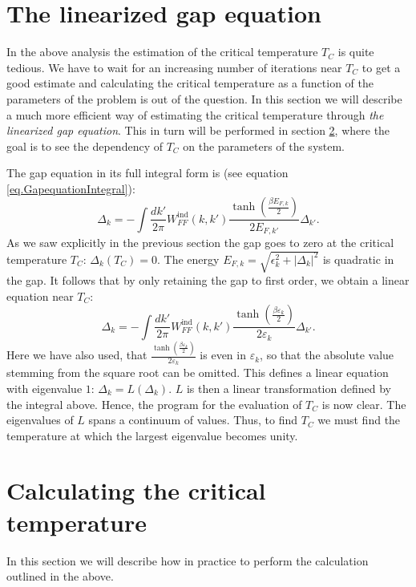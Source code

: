 \section{The linearized gap equation} \label{sec.linearizedgapequation}
In the above analysis the estimation of the critical temperature $T_C$ is quite tedious. We have to wait for an increasing number of iterations near $T_C$ to get a good estimate and calculating the critical temperature as a function of the parameters of the problem is out of the question. In this section we will describe a much more efficient way of estimating the critical temperature through \textit{the linearized gap equation}. This in turn will be performed in section \ref{sec.pairingandchemicalpotential.numericalcalculation}, where the goal is to see the dependency of $T_C$ on the parameters of the system.

The gap equation in its full integral form is (see equation \eqref{eq.GapequationIntegral}):
\begin{equation}
\Delta_k = - \int \frac{dk'}{2\pi} W^\text{ind}_{FF}(k,k')\frac{\tanh\left(\frac{\beta E_{F,k}}{2}\right)}{2E_{F,k'}}\Delta_{k'}. \nonumber
\end{equation} 
As we saw explicitly in the previous section the gap goes to zero at the critical temperature $T_C$: $\Delta_k(T_C) = 0$. The energy $E_{F,k} = \sqrt{\epsilon_k^2 + |\Delta_k|^2}$ is quadratic in the gap. It follows that by only retaining the gap to first order, we obtain a linear equation near $T_C$:
\begin{equation}
\Delta_k = - \int \frac{dk'}{2\pi} W^\text{ind}_{FF}(k,k')\frac{\tanh\left(\frac{\beta \varepsilon_k}{2}\right)}{2\varepsilon_k} \Delta_{k'}.
\label{eq.GapequationIntegralLinear}
\end{equation} 
Here we have also used, that $\frac{\tanh\left(\frac{\beta \varepsilon_k}{2}\right)}{2\varepsilon_k}$ is even in $\varepsilon_k$, so that the absolute value stemming from the square root can be omitted. This defines a linear equation with eigenvalue $1$: $\Delta_k = L(\Delta_k)$. $L$ is then a linear transformation defined by the integral above. Hence, the program for the evaluation of $T_C$ is now clear. The eigenvalues of $L$ spans a continuum of values. Thus, to find $T_C$ we must find the temperature at which the largest eigenvalue becomes unity. 

\section{Calculating the critical temperature} \label{sec.pairingandchemicalpotential.numericalcalculation}
In this section we will describe how in practice to perform the calculation outlined in the above. 

